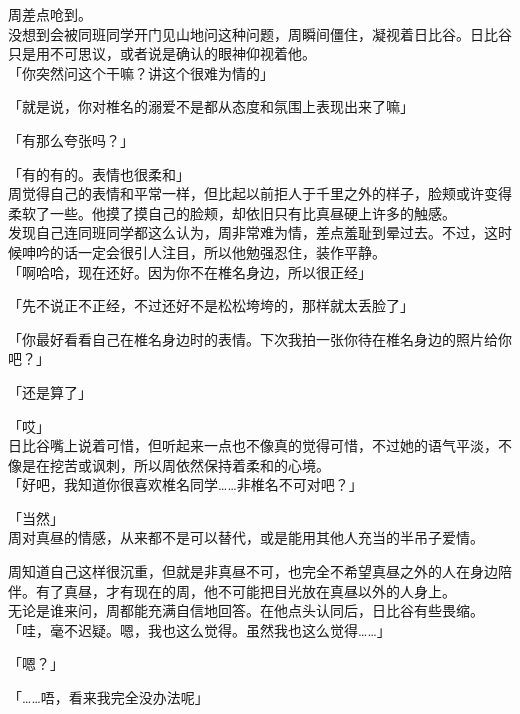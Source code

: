 周差点呛到。\\

没想到会被同班同学开门见山地问这种问题，周瞬间僵住，凝视着日比谷。日比谷只是用不可思议，或者说是确认的眼神仰视着他。\\

「你突然问这个干嘛？讲这个很难为情的」

「就是说，你对椎名的溺爱不是都从态度和氛围上表现出来了嘛」

「有那么夸张吗？」

「有的有的。表情也很柔和」\\

周觉得自己的表情和平常一样，但比起以前拒人于千里之外的样子，脸颊或许变得柔软了一些。他摸了摸自己的脸颊，却依旧只有比真昼硬上许多的触感。\\

发现自己连同班同学都这么认为，周非常难为情，差点羞耻到晕过去。不过，这时候呻吟的话一定会很引人注目，所以他勉强忍住，装作平静。\\

「啊哈哈，现在还好。因为你不在椎名身边，所以很正经」

「先不说正不正经，不过还好不是松松垮垮的，那样就太丢脸了」

「你最好看看自己在椎名身边时的表情。下次我拍一张你待在椎名身边的照片给你吧？」

「还是算了」

「哎」\\

日比谷嘴上说着可惜，但听起来一点也不像真的觉得可惜，不过她的语气平淡，不像是在挖苦或讽刺，所以周依然保持着柔和的心境。\\

「好吧，我知道你很喜欢椎名同学……非椎名不可对吧？」

「当然」\\

周对真昼的情感，从来都不是可以替代，或是能用其他人充当的半吊子爱情。

周知道自己这样很沉重，但就是非真昼不可，也完全不希望真昼之外的人在身边陪伴。有了真昼，才有现在的周，他不可能把目光放在真昼以外的人身上。\\

无论是谁来问，周都能充满自信地回答。在他点头认同后，日比谷有些畏缩。\\

「哇，毫不迟疑。嗯，我也这么觉得。虽然我也这么觉得……」

「嗯？」

「……唔，看来我完全没办法呢」\\

